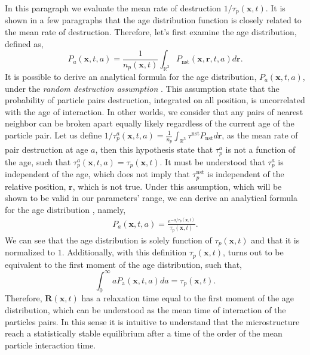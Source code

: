 In this paragraph we evaluate the mean rate of destruction $1/\tau_p(\textbf{x},t)$. 
It is shown in a few paragraphs that the age distribution function is closely related to the mean rate of destruction. 
Therefore, let's first examine the age distribution, defined as, 
\begin{equation*}
    P_a(\textbf{x},t,a)
    = \frac{1}{n_p(\textbf{x},t)}
    \int_{\mathbb{R}^3}
    P_\text{nst}(\textbf{x},\textbf{r},t,a)
    d\textbf{r}.
\end{equation*} 
It is possible to derive an analytical formula for the age distribution, $P_a(\textbf{x},t,a)$, under the \textit{random destruction assumption} \citep{zhang2023evolution}.
This assumption state that the probability of particle pairs destruction, integrated on all position, is uncorrelated with the age of interaction.
In other worlds, we consider that any pairs of nearest neighbor can be broken apart equally likely regardless of the current age of the particle pair. 
Let us define $1/\tau_p^a(\textbf{x},t,a) = \frac{1}{n_p}\int_{\mathbb{R}^3}\tau^\text{nst} P_\text{nst}d\textbf{r}$, as the mean rate of pair destruction at age $a$, then this hypothesis state that $\tau^a_p$ is not a function of the age, such that $\tau^a_p(\textbf{x},t,a) = \tau_p(\textbf{x},t)$. 
It must be understood that $\tau^a_p$ is independent of the age, which does not imply that $\tau^\text{nst}_p$ is independent of the relative position, $\textbf{r}$, which is not true.
Under this assumption, which will be shown to be valid in our parameters' range, we can derive an analytical formula for the age distribution \citep{zhang2023evolution}, namely,
\begin{align}
    P_a(\textbf{x},t, a)  
    =\frac{e^{-a/\tau_p(\textbf{x},t)}}{\tau_p(\textbf{x},t)}.
    \label{eq:Pa}
\end{align} 
We can see that the age distribution is solely function of $\tau_p(\textbf{x},t)$ and that it is normalized to $1$.
Additionally, with this definition $\tau_p(\textbf{x},t)$, turns out to be equivalent to the first moment of the age distribution, such that, 
\begin{equation*}
    \int_{0}^\infty
    a P_\text{a}(\textbf{x},t,a)
    da
    =\tau_p(\textbf{x},t). 
\end{equation*}
Therefore, $\textbf{R}(\textbf{x},t)$ has a relaxation time equal to the first moment of the age distribution, which can be understood as the mean time of interaction of the particles pairs. 
In this sense it is intuitive to understand that the microstructure reach a statistically stable equilibrium after a time of the order of the mean particle interaction time. 

